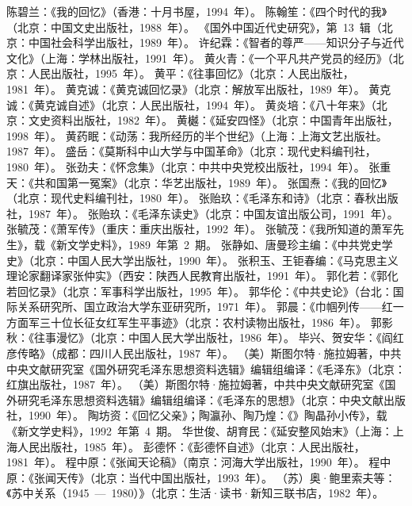 \begin{thebibliography}{999}
\bibitem{}陈碧兰：《我的回忆》（香港：十月书屋，1994~年）。
\bibitem{}陈翰笙：《四个时代的我》（北京：中国文史出版社，1988~年）。
\bibitem{}《国外中国近代史研究》，第~13~辑（北京：中国社会科学出版社，1989~年）。
\bibitem{}许纪霖：《智者的尊严——知识分子与近代文化》（上海：学林出版社，1991~年）。
\bibitem{}黄火青：《一个平凡共产党员的经历》（北京：人民出版社，1995~年）。
\bibitem{}黄平：《往事回忆》（北京：人民出版社，1981~年）。
\bibitem{}黄克诚：《黄克诚回忆录》（北京：解放军出版社，1989~年）。
\bibitem{}黄克诚：《黄克诚自述》（北京：人民出版社，1994~年）。
\bibitem{}黄炎培：《八十年来》（北京：文史资料出版社，1982~年）。
\bibitem{}黄樾：《延安四怪》（北京：中国青年出版社，1998~年）。
\bibitem{}黄药眠：《动荡：我所经历的半个世纪》（上海：上海文艺出版社。1987~年）。
\bibitem{}盛岳：《莫斯科中山大学与中国革命》（北京：现代史料编刊社，1980~年）。
\bibitem{}张劲夫：《怀念集》（北京：中共中央党校出版社，1994~年）。
\bibitem{}张重天：《共和国第一冤案》（北京：华艺出版社，1989~年）。
\bibitem{}张国焘：《我的回忆》（北京：现代史料编刊社，1980~年）。
\bibitem{}张贻玖：《毛泽东和诗》（北京：春秋出版社，1987~年）。
\bibitem{}张贻玖：《毛泽东读史》（北京：中国友谊出版公司，1991~年）。
\bibitem{}张毓茂：《萧军传》（重庆：重庆出版社，1992~年）。
\bibitem{}张毓茂：《我所知道的萧军先生》，载《新文学史料》，1989~年第~2~期。
\bibitem{}张静如、唐曼珍主编：《中共党史学史》（北京：中国人民大学出版社，1990~年）。
\bibitem{}张积玉、王钜春编：《马克思主义理论家翻译家张仲实》（西安：陕西人民教育出版社，1991~年）。
\bibitem{}郭化若：《郭化若回忆录》（北京：军事科学出版社，1995~年）。
\bibitem{}郭华伦：《中共史论》（台北：国际关系研究所、国立政治大学东亚研究所，1971~年）。
\bibitem{}郭晨：《巾帼列传——红一方面军三十位长征女红军生平事迹》（北京：农村读物出版社，1986~年）。
\bibitem{}郭影秋：《往事漫忆》（北京：中国人民大学出版社，1986~年）。
\bibitem{}毕兴、贺安华：《阎红彦传略》（成都：四川人民出版社，1987~年）。
\bibitem{}（美）斯图尔特·施拉姆著，中共中央文献研究室《国外研究毛泽东思想资料选辑》编辑组编译：《毛泽东》（北京：红旗出版社，1987~年）。
\bibitem{}（美）斯图尔特·施拉姆著，中共中央文献研究室《国外研究毛泽东思想资料选辑》编辑组编译：《毛泽东的思想》（北京：中央文献出版社，1990~年）。
\bibitem{}陶坊资：《回忆父亲》；陶瀛孙、陶乃煌：《》陶晶孙小传》，载《新文学史料》，1992~年第~4~期。
\bibitem{}华世俊、胡育民：《延安整风始末》（上海：上海人民出版社，1985~年）。
\bibitem{}彭德怀：《彭德怀自述》（北京：人民出版社，1981~年）。
\bibitem{}程中原：《张闻天论稿》（南京：河海大学出版社，1990~年）。
\bibitem{}程中原：《张闻天传》（北京：当代中国出版社，1993~年）。
\bibitem{}（苏）奥·鲍里索夫等：《苏中关系（1945~—~1980）》（北京：生活·读书·新知三联书店，1982~年）。

\end{thebibliography}
